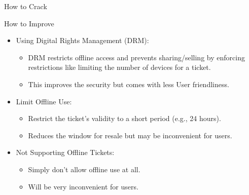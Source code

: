 \documentclass[final,dvipsnames]{beamer}
\newlength{\sepwidth}
\newlength{\colwidth}
\newcommand{\separatorcolumn}{\begin{column}{\sepwidth}\end{column}}
\begin{document}
\begin{frame}[t, fragile]
\begin{columns}[t]
\begin{column}{\colwidth}
\begin{block}{How to Crack}
    \end{block}
    \begin{block}{How to Improve}
        \begin{itemize}
            \item Using Digital Rights Management (DRM):
            \begin{itemize}
                \item DRM restricts offline access and prevents sharing/selling by enforcing restrictions like limiting the number of devices for a ticket.
                \item This improves the security but comes with less User friendliness.
            \end{itemize}
            \item Limit Offline Use:
            \begin{itemize}
                \item Restrict the ticket’s validity to a short period (e.g., 24 hours). 
                \item Reduces the window for resale but may be inconvenient for users.
            \end{itemize}
            \item Not Supporting Offline Tickets:
            \begin{itemize}
                \item Simply don't allow offline use at all.
                \item Will be very inconvenient for users.
            \end{itemize}
        \end{itemize}
    \end{block}
    

\end{column}




\separatorcolumn
\end{columns}
\end{frame}
\end{document}
